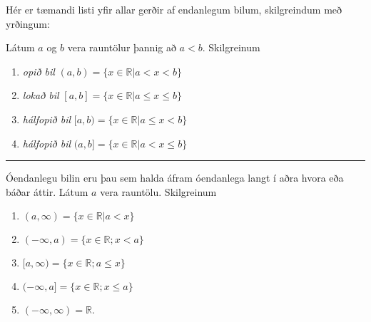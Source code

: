 \documentclass[a4paper,10pt,icelandic]{sphinxmanual}
\begin{document}
Hér er tæmandi listi yfir allar gerðir af endanlegum bilum, skilgreindum með yrðingum:

Látum \(a\) og \(b\) vera rauntölur þannig að
\(a<b\). Skilgreinum
\begin{enumerate}
%
\item {} 
\textit{opið bil} \((a,b)=\{x\in \mathbb{R}| a<x<b\}\)

\item {} 
\textit{lokað bil} \([a,b]=\{x\in \mathbb{R}| a\leq x\leq b\}\)

\item {} 
\textit{hálfopið bil} \([a,b)=\{x\in \mathbb{R}| a\leq x<b\}\)

\item {} 
\textit{hálfopið bil} \((a,b]=\{x\in \mathbb{R}| a< x\leq b\}\)

\end{enumerate}



\bigskip\hrule\bigskip


Óendanlegu bilin eru þau sem halda áfram óendanlega langt í aðra hvora eða báðar áttir.
Látum \(a\) vera rauntölu. Skilgreinum
\begin{enumerate}
%
\setcounter{enumi}{4}
\item {} 
 \((a,\infty)=\{x\in \mathbb{R}| a<x\}\)

\item {} 
 \((-\infty, a)=\{x\in \mathbb{R}; x<a\}\)

\item {} 
 \([a,\infty)=\{x\in \mathbb{R}; a\leq x\}\)

\item {} 
 \((-\infty, a]=\{x\in \mathbb{R}; x\leq a\}\)

\item {} 
 \((-\infty, \infty)= \mathbb{R}\).

\end{enumerate}

\end{document}
